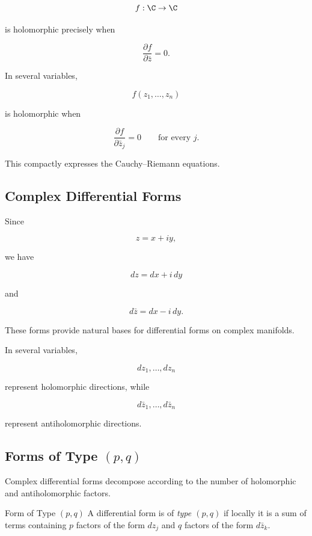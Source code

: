 \[
f:\C\to\C
\]

is holomorphic precisely when

\[
\boxed{
\frac{\partial f}{\partial\bar z}=0.
}
\]

In several variables,

\[
f(z_1,\ldots,z_n)
\]

is holomorphic when

\[
\boxed{
\frac{\partial f}{\partial\bar z_j}=0
\qquad
\text{for every }j.
}
\]

This compactly expresses the Cauchy--Riemann equations.

\subsection{Complex Differential Forms}
\label{subsec:complex-differential-forms}

Since

\[
z=x+iy,
\]

we have

\[
\boxed{
dz=dx+i\,dy
}
\]

and

\[
\boxed{
d\bar z=dx-i\,dy.
}
\]

These forms provide natural bases for differential forms on complex
manifolds.

In several variables,

\[
dz_1,\ldots,dz_n
\]

represent holomorphic directions, while

\[
d\bar z_1,\ldots,d\bar z_n
\]

represent antiholomorphic directions.

\subsection{Forms of Type \((p,q)\)}
\label{subsec:pq-forms}

Complex differential forms decompose according to the number of holomorphic
and antiholomorphic factors.

\begin{definitionbox}{Form of Type \((p,q)\)}
A differential form is of \emph{type \((p,q)\)} if locally it is a sum of
terms containing \(p\) factors of the form \(dz_j\) and \(q\) factors of the
form \(d\bar z_k\).
\end{definitionbox}

